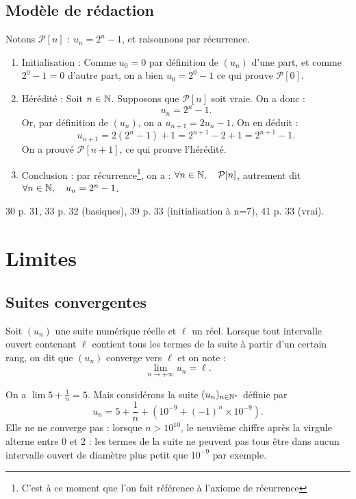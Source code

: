 \documentclass[a4paper,11pt,DIV20,BCOR0mm]{scrartcl}
\begin{document}
\subsection{Modèle de rédaction}
Notons $\mathcal{P}[n]$  : \og$u_n=2^n-1$\fg, et raisonnons par récurrence.
\begin{enumerate}
    \item Initialisation : Comme $u_0=0$ par définition de $(u_n)$ d'une part, et comme $2^0-1=0$ d'autre part, on a bien $u_0=2^0-1$ ce qui prouve 
    $\mathcal{P}[0]$.
     \item Hérédité : Soit $n\in\mathbb{N}$. Supposons que $\mathcal{P}[n]$ soit vraie. On a donc :
    \[
	    u_n=2^n-1.
    \]
    Or, par définition de $(u_n)$, on a $u_{n+1}=2u_n-1$. On en déduit :
    \[
	    u_{n+1}=2(2^n-1)+1=2^{n+1}-2+1=2^{n+1}-1.
    \]
    On a prouvé $\mathcal{P}[n+1]$, ce qui prouve l'hérédité.
    \item Conclusion : par récurrence\footnote{C'est à ce moment que l'on fait référence à l'axiome de récurrence},
   on a : $\forall n\in\mathbb{N},\quad \mathcal{P}[n]$, autrement dit $\forall n\in\mathbb{N},\quad u_n=2^n-1$.
\end{enumerate}

\begin{exercice}
 30 p. 31, 33 p. 32 (basiques), 39 p. 33 (initialisation à n=7), 41 p. 33 (vrai).
\end{exercice}




\pagebreak
\section{Limites}
\subsection{Suites convergentes}
\begin{definition}
 Soit $(u_n)$ une suite numérique réelle et $\ell$ un réel. Lorsque tout intervalle ouvert contenant $\ell$
contient tous les termes de la suite à partir d'un certain rang, on dit que $(u_n)$ converge vers $\ell$ et
on note :
\[
 \lim_{n\to+\infty}u_n=\ell.
\]
\end{definition}
\begin{exemple}
 On a $
 \lim 5+\frac{1}{n}=5.
$
Mais considérons la suite $(u_n)_{n\in\mathbb{N}^*}$ définie par \[
 u_n=5+\frac{1}{n}+(10^{-9}+(-1)^n\times 10^{-9}).
\]
Elle ne ne converge pas : lorsque $n> 10^{10}$, le neuvième chiffre après la virgule alterne entre
0 et 2 : les termes de la suite ne peuvent pas tous être dans aucun intervalle ouvert
de diamètre plus petit que $10^{-9}$ par exemple.
\end{exemple}
\end{document}
